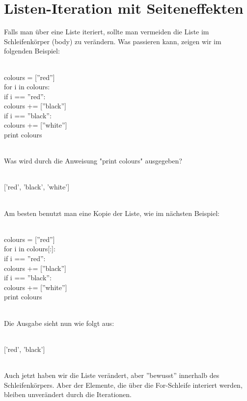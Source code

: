 \section{
Listen-Iteration mit Seiteneffekten}
Falls man über eine Liste iteriert, sollte man vermeiden die Liste im Schleifenkörper (body) zu verändern. Was passieren kann, zeigen wir im folgenden Beispiel: \\
\\
\begin{MyConsoleBox}{
colours = [''red''] \\
for i in colours: \\
\hspace{0.5cm}    if i == ''red'': \\
\hspace{1.0cm}        colours += [''black''] \\
\hspace{0.5cm}    if i == ''black'': \\
\hspace{1.0cm}        colours += [''white''] \\
print colours \\
}\end{MyConsoleBox}
\\
Was wird durch die Anweisung "print colours" ausgegeben? \\
\\
\begin{MyConsoleBox}{
['red', 'black', 'white']
}\end{MyConsoleBox}
\\
Am besten benutzt man eine Kopie der Liste, wie im nächsten Beispiel: \\
\\
\begin{MyConsoleBox}{
colours = [''red''] \\
for i in colours[:]: \\
\hspace{0.5cm}    if i == ''red'': \\
\hspace{1.0cm}        colours += [''black''] \\
\hspace{0.5cm}    if i == ''black'': \\
\hspace{1.0cm}        colours += [''white''] \\
print colours \\
}\end{MyConsoleBox}
\\
Die Ausgabe sieht nun wie folgt aus: \\
\\
\begin{MyConsoleBox}{
['red', 'black']
}\end{MyConsoleBox}
\\
Auch jetzt haben wir die Liste verändert, aber ''bewusst'' innerhalb des Schleifenkörpers. Aber der Elemente, die über die For-Schleife interiert werden, bleiben unverändert durch die Iterationen. \\
\\
